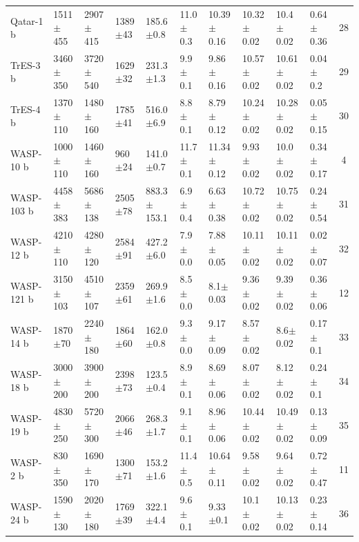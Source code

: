 \begin{subappendices}
{\begin{landscape}
\begin{longtable}{llllllllllc}
  Qatar-1 b   &    1511$\pm$455 &    2907$\pm$415 &   1389$\pm$43 &    185.6$\pm$0.8 &  11.0$\pm$0.3 &  10.39$\pm$0.16 &  10.32$\pm$0.02 &   10.4$\pm$0.02 &   0.64$\pm$0.36 &       28 \\
  TrES-3 b    &    3460$\pm$350 &    3720$\pm$540 &   1629$\pm$32 &    231.3$\pm$1.3 &   9.9$\pm$0.1 &   9.86$\pm$0.16 &  10.57$\pm$0.02 &  10.61$\pm$0.02 &    0.04$\pm$0.2 &       29 \\
  TrES-4 b    &    1370$\pm$110 &    1480$\pm$160 &   1785$\pm$41 &    516.0$\pm$6.9 &   8.8$\pm$0.1 &   8.79$\pm$0.12 &  10.24$\pm$0.02 &  10.28$\pm$0.02 &   0.05$\pm$0.15 &       30 \\
  WASP-10 b   &    1000$\pm$110 &    1460$\pm$160 &    960$\pm$24 &    141.0$\pm$0.7 &  11.7$\pm$0.1 &  11.34$\pm$0.12 &   9.93$\pm$0.02 &   10.0$\pm$0.02 &   0.34$\pm$0.17 &        4 \\
  WASP-103 b  &    4458$\pm$383 &    5686$\pm$138 &   2505$\pm$78 &  883.3$\pm$153.1 &   6.9$\pm$0.4 &   6.63$\pm$0.38 &  10.72$\pm$0.02 &  10.75$\pm$0.02 &   0.24$\pm$0.54 &       31 \\
  WASP-12 b   &    4210$\pm$110 &    4280$\pm$120 &   2584$\pm$91 &    427.2$\pm$6.0 &   7.9$\pm$0.0 &   7.88$\pm$0.05 &  10.11$\pm$0.02 &  10.11$\pm$0.02 &   0.02$\pm$0.07 &       32 \\
  WASP-121 b  &    3150$\pm$103 &    4510$\pm$107 &   2359$\pm$61 &    269.9$\pm$1.6 &   8.5$\pm$0.0 &    8.1$\pm$0.03 &   9.36$\pm$0.02 &   9.39$\pm$0.02 &   0.36$\pm$0.06 &       12 \\
  WASP-14 b   &     1870$\pm$70 &    2240$\pm$180 &   1864$\pm$60 &    162.0$\pm$0.8 &   9.3$\pm$0.0 &   9.17$\pm$0.09 &   8.57$\pm$0.02 &    8.6$\pm$0.02 &    0.17$\pm$0.1 &       33 \\
  WASP-18 b   &    3000$\pm$200 &    3900$\pm$200 &   2398$\pm$73 &    123.5$\pm$0.4 &   8.9$\pm$0.1 &   8.69$\pm$0.06 &   8.07$\pm$0.02 &   8.12$\pm$0.02 &    0.24$\pm$0.1 &       34 \\
  WASP-19 b   &    4830$\pm$250 &    5720$\pm$300 &   2066$\pm$46 &    268.3$\pm$1.7 &   9.1$\pm$0.1 &   8.96$\pm$0.06 &  10.44$\pm$0.02 &  10.49$\pm$0.02 &   0.13$\pm$0.09 &       35 \\
  WASP-2 b    &     830$\pm$350 &    1690$\pm$170 &   1300$\pm$71 &    153.2$\pm$1.6 &  11.4$\pm$0.5 &  10.64$\pm$0.11 &   9.58$\pm$0.02 &   9.64$\pm$0.02 &   0.72$\pm$0.47 &       11 \\
  WASP-24 b   &    1590$\pm$130 &    2020$\pm$180 &   1769$\pm$39 &    322.1$\pm$4.4 &   9.6$\pm$0.1 &    9.33$\pm$0.1 &   10.1$\pm$0.02 &  10.13$\pm$0.02 &   0.23$\pm$0.14 &       36 \\

\end{longtable}
\end{landscape}}
\end{subappendices}
